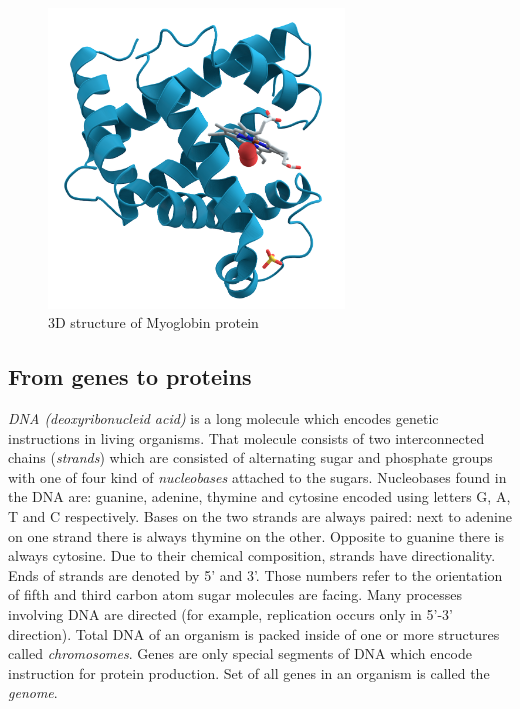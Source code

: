 \documentclass[times, utf8, diplomski]{fer}
\begin{document}
\begin{figure}[!ht]
\begin{center}
	\includegraphics[width=0.7\textwidth]{../img/Myoglobin.png}
	\caption{3D structure of Myoglobin protein\protect\cite{myoglobin.img}}\label{myoglobin}
\end{center}
\end{figure}

\subsection{From genes to proteins}

\emph{DNA (deoxyribonucleid acid)} is a long molecule which encodes genetic instructions in living organisms. That molecule consists of two interconnected chains (\emph{strands}) which are consisted of alternating sugar and phosphate groups with one of four kind of \emph{nucleobases} attached to the sugars. Nucleobases found in the DNA are: guanine, adenine, thymine and cytosine encoded using letters G, A, T and C respectively. Bases on the two strands are always paired: next to adenine on one strand there is always thymine on the other. Opposite to guanine there is always cytosine. Due to their chemical composition, strands have directionality. Ends of strands are denoted by 5' and 3'. Those numbers refer to the orientation of fifth and third carbon atom sugar molecules are facing. Many processes involving DNA are directed (for example, replication occurs only in 5'-3' direction). Total DNA of an organism is packed inside of one or more structures called \emph{chromosomes}. Genes are only special segments of DNA which encode instruction for protein production. Set of all genes in an organism is called the \emph{genome}.
\\
\end{document}

